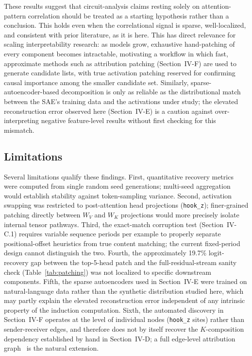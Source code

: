 \documentclass[conference]{IEEEtran}
\begin{document}
These results suggest that circuit-analysis claims resting solely on attention-pattern correlation should be treated as a starting hypothesis rather than a conclusion. This holds even when the correlational signal is sparse, well-localized, and consistent with prior literature, as it is here. This has direct relevance for scaling interpretability research: as models grow, exhaustive hand-patching of every component becomes intractable, motivating a workflow in which fast, approximate methods such as attribution patching (Section~IV-F) are used to generate candidate lists, with true activation patching reserved for confirming causal importance among the smaller candidate set. Similarly, sparse-autoencoder-based decomposition is only as reliable as the distributional match between the SAE's training data and the activations under study; the elevated reconstruction error observed here (Section~IV-E) is a caution against over-interpreting negative feature-level results without first checking for this mismatch.

\subsection{Limitations}

Several limitations qualify these findings. First, quantitative recovery metrics were computed from single random seed generations; multi-seed aggregation would establish stability against token-sampling variance. Second, activation swapping was restricted to post-attention head projections (\texttt{hook\_z}); finer-grained patching directly between $W_V$ and $W_K$ projections would more precisely isolate internal tensor pathways. Third, the exact-match corruption test (Section~IV-C.1) requires variable sequence periods per example to properly separate positional-offset heuristics from true content matching; the current fixed-period design cannot distinguish the two. Fourth, the approximately 19.7\% logit-recovery gap between the top-5-head patch and the full-residual-stream sanity check (Table~\ref{tab:patching}) was not localized to specific downstream components. Fifth, the sparse autoencoders used in Section~IV-E were trained on natural-language data rather than the synthetic distribution studied here, which may partly explain the elevated reconstruction error independent of any intrinsic property of the induction computation. Sixth, the automated discovery in Section~IV-F operates at the level of individual nodes (\texttt{hook\_z} sites) rather than sender-receiver edges, and therefore does not by itself recover the $K$-composition dependency established by hand in Section~IV-D; a full edge-level attribution graph~\cite{conmy2023} is the natural extension.
\end{document}
